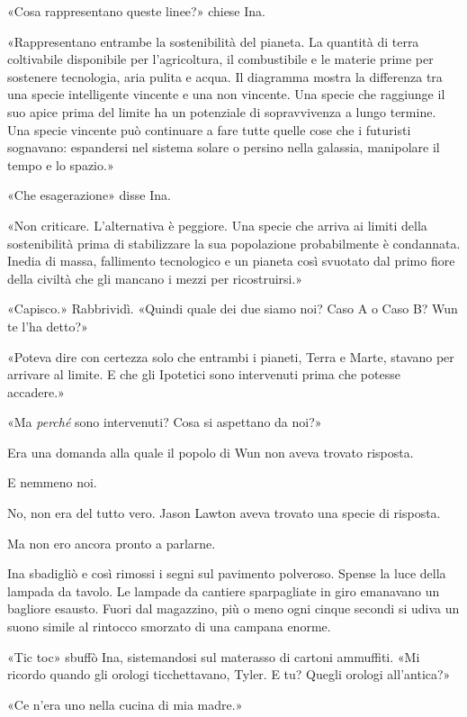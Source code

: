 «Cosa rappresentano queste linee?» chiese Ina.

«Rappresentano entrambe la sostenibilità del pianeta. La quantità di
terra coltivabile disponibile per l'agricoltura, il combustibile e le
materie prime per sostenere tecnologia, aria pulita e acqua. Il
diagramma mostra la differenza tra una specie intelligente vincente e
una non vincente. Una specie che raggiunge il suo apice prima del limite
ha un potenziale di sopravvivenza a lungo termine. Una specie vincente
può continuare a fare tutte quelle cose che i futuristi sognavano:
espandersi nel sistema solare o persino nella galassia, manipolare il
tempo e lo spazio.»

«Che esagerazione» disse Ina.

«Non criticare. L'alternativa è peggiore. Una specie che arriva ai
limiti della sostenibilità prima di stabilizzare la sua popolazione
probabilmente è condannata. Inedia di massa, fallimento tecnologico e un
pianeta così svuotato dal primo fiore della civiltà che gli mancano i
mezzi per ricostruirsi.»

«Capisco.» Rabbrividì. «Quindi quale dei due siamo noi? Caso A o Caso B?
Wun te l'ha detto?»

«Poteva dire con certezza solo che entrambi i pianeti, Terra e Marte,
stavano per arrivare al limite. E che gli Ipotetici sono intervenuti
prima che potesse accadere.»

«Ma \emph{perché} sono intervenuti? Cosa si aspettano da noi?»

Era una domanda alla quale il popolo di Wun non aveva trovato risposta.

E nemmeno noi.

No, non era del tutto vero. Jason Lawton aveva trovato una specie di
risposta.

Ma non ero ancora pronto a parlarne.

\separatorefiori

Ina sbadigliò e così rimossi i segni sul pavimento polveroso. Spense la
luce della lampada da tavolo. Le lampade da cantiere sparpagliate in
giro emanavano un bagliore esausto. Fuori dal magazzino, più o meno ogni
cinque secondi si udiva un suono simile al rintocco smorzato di una
campana enorme.

«Tic toc» sbuffò Ina, sistemandosi sul materasso di cartoni ammuffiti.
«Mi ricordo quando gli orologi ticchettavano, Tyler. E tu? Quegli
orologi all'antica?»

«Ce n'era uno nella cucina di mia madre.»

